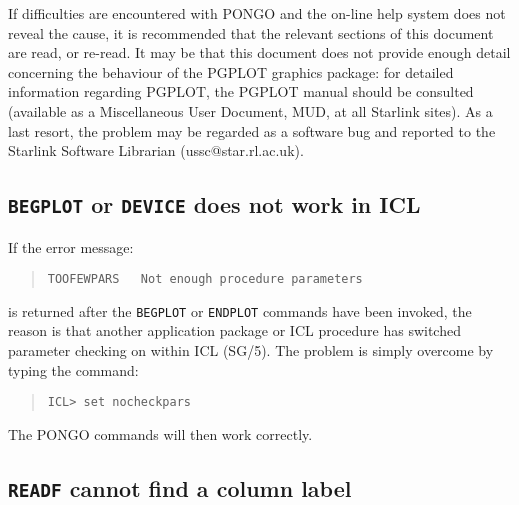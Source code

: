 \documentclass[twoside,11pt]{article}
\newcommand{\htmlref}[2]{#1}
\newcommand{\xref}[3]{#1}
\renewcommand{\_}{\texttt{\symbol{95}}}
\newcommand{\cnam}[1]{{\tt #1}}
\newcommand{\iref} [1]{\htmlref{#1}{#1}}
\begin{document}
If difficulties are encountered with PONGO and the on-line help system
does not reveal the cause, it is recommended that the relevant
sections of this document are read, or re-read.  It may be that this
document does not provide enough detail concerning the behaviour of
the PGPLOT graphics package: for detailed information regarding
PGPLOT, the PGPLOT manual should be consulted (available as a
Miscellaneous User Document, MUD, at all Starlink sites).  As a last
resort, the problem may be regarded as a software bug and reported to
the Starlink Software Librarian (ussc@star.rl.ac.uk).


\subsection{\cnam{BEGPLOT} or \cnam{DEVICE} does not work in ICL}

If the error message:
\begin{quote}
\begin{verbatim}
TOOFEWPARS   Not enough procedure parameters
\end{verbatim}
\end{quote}
is returned after the \cnam{\iref{BEGPLOT}} or \cnam{\iref{ENDPLOT}}
commands have been invoked, the reason is that another application
package or ICL procedure has switched parameter checking on within ICL
\xref{(SG/5)}{sg5}{}.  The problem is simply overcome by typing the command:
\begin{quote}
\begin{verbatim}
ICL> set nocheckpars
\end{verbatim}
\end{quote}
The PONGO commands will then work correctly.

\subsection{\cnam{READF} cannot find a column label}
\end{document}
